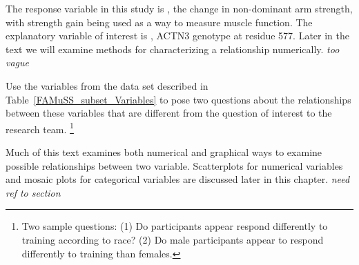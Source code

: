 \begin{doublespace}
The response variable in this study is , the change in non-dominant arm strength, with strength gain being used as a way to measure muscle function. The explanatory variable of interest is , ACTN3 genotype at residue 577.  Later in the text we will examine methods for characterizing a relationship numerically.  \textit{too vague}

\begin{exercise}
Use the variables from the  data set described in Table~\ref{FAMuSS_subset_Variables} to pose two questions about the relationships between these variables that are different from the question of interest to the research team. \footnote{Two sample questions: (1)  Do participants appear respond differently to training according to race?  (2)  Do male participants appear to respond differently to training than females.}

\end{exercise}

Much of this text examines both numerical and graphical ways to examine possible relationships between two variable.  Scatterplots for numerical variables and mosaic plots for categorical variables are discussed later in this chapter.  \textit{need ref to section}

\end{doublespace}
